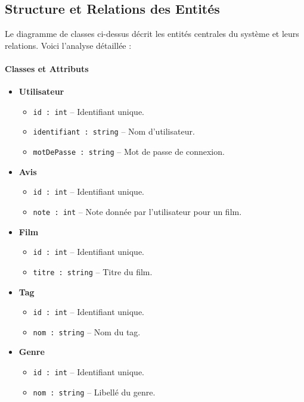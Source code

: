 \documentclass{article}
\begin{document}
\subsection{Structure et Relations des Entités}

Le diagramme de classes ci-dessus décrit les entités centrales du système et leurs relations. Voici l’analyse détaillée :

\paragraph{Classes et Attributs}

\begin{itemize}
    \item \textbf{Utilisateur}
    \begin{itemize}
        \item \texttt{id : int} -- Identifiant unique.
        \item \texttt{identifiant : string} -- Nom d'utilisateur.
        \item \texttt{motDePasse : string} -- Mot de passe de connexion.
    \end{itemize}
    
    \item \textbf{Avis}
    \begin{itemize}
        \item \texttt{id : int} -- Identifiant unique.
        \item \texttt{note : int} -- Note donnée par l'utilisateur pour un film.
    \end{itemize}

    \item \textbf{Film}
    \begin{itemize}
        \item \texttt{id : int} -- Identifiant unique.
        \item \texttt{titre : string} -- Titre du film.
    \end{itemize}

    \item \textbf{Tag}
    \begin{itemize}
        \item \texttt{id : int} -- Identifiant unique.
        \item \texttt{nom : string} -- Nom du tag.
    \end{itemize}

    \item \textbf{Genre}
    \begin{itemize}
        \item \texttt{id : int} -- Identifiant unique.
        \item \texttt{nom : string} -- Libellé du genre.
    \end{itemize}
\end{itemize}
\end{document}
